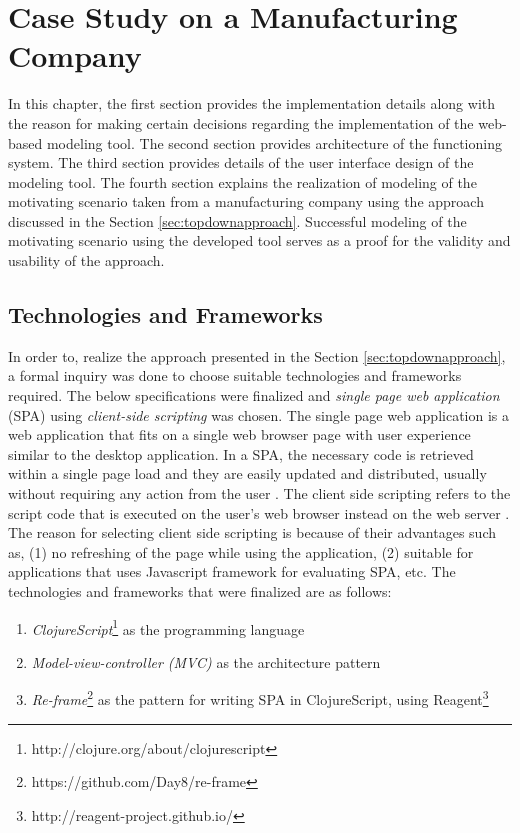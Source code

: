 \chapter{Case Study on a Manufacturing Company}
\label{chap:casestudy}

In this chapter, the first section provides the implementation details along with the reason for making certain decisions regarding the implementation of the web-based modeling tool. The second section provides architecture of the functioning system. The third section provides details of the user interface design of the modeling tool. The fourth section explains the realization of modeling of the motivating scenario taken from a manufacturing company using the approach discussed in the Section \ref{sec:topdownapproach}. Successful modeling of the motivating scenario using the developed tool serves as a proof for the validity and usability of the approach. 

\section{Technologies and Frameworks}
\label{subsec:specifications}
In order to, realize the approach presented in the Section \ref{sec:topdownapproach}, a formal inquiry was done to choose suitable technologies and frameworks required. The below specifications were finalized and \textit{single page web application} (SPA) using \textit{client-side scripting} was chosen. The single page web application is a web application that fits on a single web browser page with user experience similar to the desktop application. In a SPA, the necessary code is retrieved within a single page load and they are easily updated and distributed, usually without requiring any action from the user \cite{Mikowski2013}. The client side scripting refers to the script code that is executed on the user's web browser instead on the web server \cite{Sierra2012}. The reason for selecting client side scripting is because of their advantages such as, (1) no refreshing of the page while using the application, (2) suitable for applications that uses Javascript framework for evaluating SPA, etc. The technologies and frameworks that were finalized are as follows:

\begin{enumerate}   
	\item \textit{ClojureScript}\footnote{http://clojure.org/about/clojurescript} as the programming language
	\item \textit{Model-view-controller (MVC)} \cite{Deacon2009}  as the architecture pattern
	\item \textit{Re-frame}\footnote{https://github.com/Day8/re-frame} as the pattern for writing SPA in ClojureScript, using Reagent\footnote{http://reagent-project.github.io/}	
\end{enumerate}

